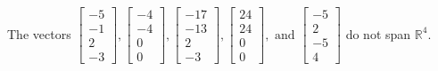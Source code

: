 \begin{exercise}
\begin{exerciseStatement}
  \end{exerciseStatement}
  \begin{exerciseAnswer}
   The vectors \(\left[\begin{array}{r}
-5 \\
-1 \\
2 \\
-3
\end{array}\right] , \left[\begin{array}{r}
-4 \\
-4 \\
0 \\
0
\end{array}\right] , \left[\begin{array}{r}
-17 \\
-13 \\
2 \\
-3
\end{array}\right] , \left[\begin{array}{r}
24 \\
24 \\
0 \\
0
\end{array}\right] , \text{ and } \left[\begin{array}{r}
-5 \\
2 \\
-5 \\
4
\end{array}\right]\) 
  	 do not  
	span \(\mathbb{R}^4\).
  


  \end{exerciseAnswer}
\end{exercise}